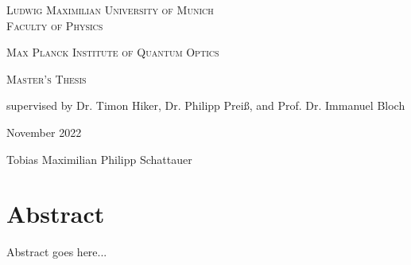 \makeatletter
\begin{titlepage}
\vspace*{\fill}
\centering

\textsc{\Large Ludwig Maximilian University of Munich}\\
\textsc{Faculty of Physics}

\vspace{1cm}

\textsc{\Large Max Planck Institute of Quantum Optics}\\

\vspace{2.5cm}

\textsc{\Huge \@title}

\vspace{0.4cm}
\Large \textrm{\@subtitle}

\vspace{3cm}
\huge \textsc{Master's Thesis}



\vspace{0.3cm}
\large \textrm{supervised by Dr. Timon Hiker, Dr. Philipp Preiß, and Prof. Dr. Immanuel Bloch}

\vspace{1cm}
\huge
\textrm{November 2022}

\vspace{1cm}
\Large \textrm{Tobias Maximilian Philipp Schattauer}

\vspace*{\fill}
\end{titlepage}
\makeatother

\null\vspace{3cm}
\section*{Abstract}

Abstract goes here...



\pagebreak
\tableofcontents
\pagebreak